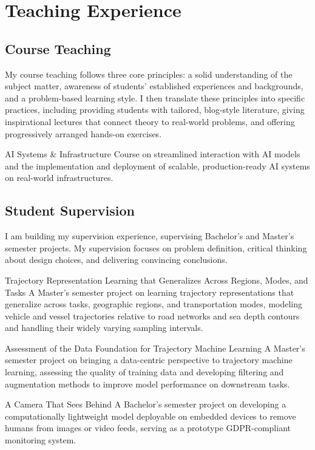 \label{sec:teaching-experience}
\section*{Teaching Experience}

\subsection*{Course Teaching}
My course teaching follows three core principles: a solid understanding of the subject matter, awareness of students' established experiences and backgrounds, and a problem-based learning style. I then translate these principles into specific practices, including providing students with tailored, blog-style literature, giving inspirational lectures that connect theory to real-world problems, and offering progressively arranged hands-on exercises.

{AI Systems \& Infrastructure}
{}
{Course on streamlined interaction with AI models and the implementation and deployment of scalable, production-ready AI systems on real-world infrastructures.}

\subsection*{Student Supervision}
I am building my supervision experience, supervising Bachelor's and Master's semester projects. My supervision focuses on problem definition, critical thinking about design choices, and delivering convincing conclusions.

{Trajectory Representation Learning that Generalizes Across Regions, Modes, and Tasks}
{}
{A Master's semester project on learning trajectory representations that generalize across tasks, geographic regions, and transportation modes, modeling vehicle and vessel trajectories relative to road networks and sea depth contours and handling their widely varying sampling intervals.}

{Assessment of the Data Foundation for Trajectory Machine Learning}
{}
{A Master's semester project on bringing a data-centric perspective to trajectory machine learning, assessing the quality of training data and developing filtering and augmentation methods to improve model performance on downstream tasks.}

{A Camera That Sees Behind}
{}
{A Bachelor's semester project on developing a computationally lightweight model deployable on embedded devices to remove humans from images or video feeds, serving as a prototype GDPR-compliant monitoring system.}
